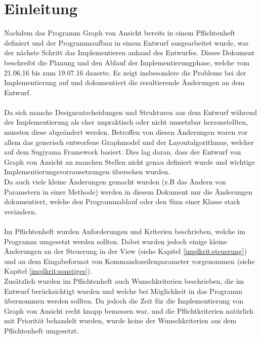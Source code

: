 \chapter{Einleitung}
\label{ch:einleitung}

Nachdem das Programm \glqq Graph von Ansicht\grqq{} bereits in einem Pflichtenheft definiert und der Programmaufbau in einem Entwurf ausgearbeitet wurde, war der nächste Schritt das Implementieren anhand des Entwurfes.
Dieses Dokument beschreibt die Planung und den Ablauf der Implementierungphase, welche vom 21.06.16 bis zum 19.07.16 dauerte. Es zeigt insbesondere die Probleme bei der Implementierung auf und dokumentiert die resultierende Änderungen an dem Entwurf.\\
\\
Da sich manche Designentscheidungen und Strukturen aus dem Entwurf während der Implementierung als eher unpraktisch oder nicht umsetzbar herausstellten, mussten diese abgeändert werden. 
Betroffen von diesen Änderungen waren vor allem das generisch entworfene Graphmodel und der Layoutalgorithmus, welcher auf dem Sugiyama Framework basiert.
Dies lag daran, dass der Entwurf von \glqq Graph von Ansicht\grqq{} an manchen Stellen nicht genau definiert wurde und wichtige Implementierungsvorrausetzungen übersehen wurden. \\ 
Da auch viele kleine Änderungen gemacht wurden (z.B das Ändern von Parametern in einer Methode) werden in diesem Dokument nur die Änderungen dokumentiert, welche den Programmablauf oder den Sinn einer Klasse stark verändern. \\
\\
Im Pflichtenheft wurden Anforderungen und Kriterien beschrieben, welche im Programm umgesetzt werden sollten. Dabei wurden jedoch einige kleine Änderungen an der Steuerung in der View (siehe Kapitel \ref{implkrit:steuerung}) und an dem Eingabeformat von Kommandozeilenparameter vorgenommen (siehe Kapitel \ref{implkrit:sonstiges}).  \\

Zusätzlich wurden im Pflichtenheft auch Wunschkriterien beschrieben, die im Entwurf berücksichtigt wurden und welche bei Möglichkeit in das Programm übernommen werden sollten. Da jedoch die Zeit für die Implementierung von \glqq Graph von Ansicht\grqq{} recht knapp bemessen war, und die Pflichtkriterien natürlich mit Priorität behandelt wurden, wurde keine der Wunschkriterien aus dem Pflichtenheft umgesetzt.